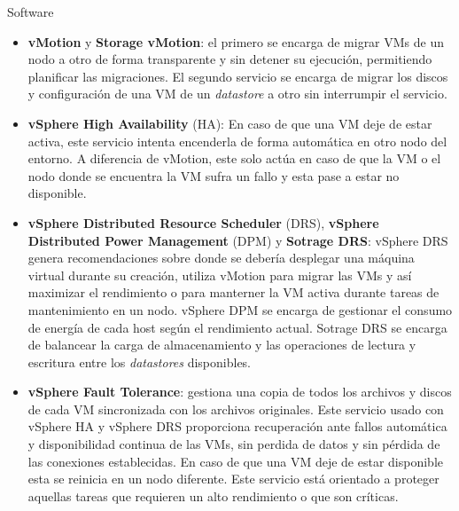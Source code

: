 \begin{section}{Software}
    \begin{itemize}
        \item \textbf{vMotion} y \textbf{Storage vMotion}: el primero se encarga de migrar VMs de un nodo a otro de forma transparente y sin detener su ejecución, permitiendo planificar las migraciones. El segundo servicio se encarga de migrar los discos y configuración de una VM de un \textit{datastore} a otro sin interrumpir el servicio.
        
        \item \textbf{vSphere High Availability} (HA): En caso de que una VM deje de estar activa, este servicio intenta encenderla de forma automática en otro nodo del entorno. A diferencia de vMotion, este solo actúa en caso de que la VM o el nodo donde se encuentra la VM sufra un fallo y esta pase a estar no disponible. 
        
        \item \textbf{vSphere Distributed Resource Scheduler} (DRS), \textbf{vSphere Distributed Power Management} (DPM) y \textbf{Sotrage DRS}: vSphere DRS genera recomendaciones sobre donde se debería desplegar una máquina virtual durante su creación, utiliza vMotion para migrar las VMs y así maximizar el rendimiento o para manterner la VM activa durante tareas de mantenimiento en un nodo. vSphere DPM se encarga de gestionar el consumo de energía de cada host según el rendimiento actual. Sotrage DRS se encarga de balancear la carga de almacenamiento y las operaciones de lectura y escritura entre los \textit{datastores} disponibles.
        
        \item \textbf{vSphere Fault Tolerance}: gestiona una copia de todos los archivos y discos de cada VM sincronizada con los archivos originales. Este servicio usado con vSphere HA y vSphere DRS proporciona recuperación ante fallos automática y disponibilidad continua de las VMs, sin perdida de datos y sin pérdida de las conexiones establecidas. En caso de que una VM deje de estar disponible esta se reinicia en un nodo diferente. Este servicio está orientado a proteger aquellas tareas que requieren un alto rendimiento o que son críticas.
    \end{itemize}
\end{section}


